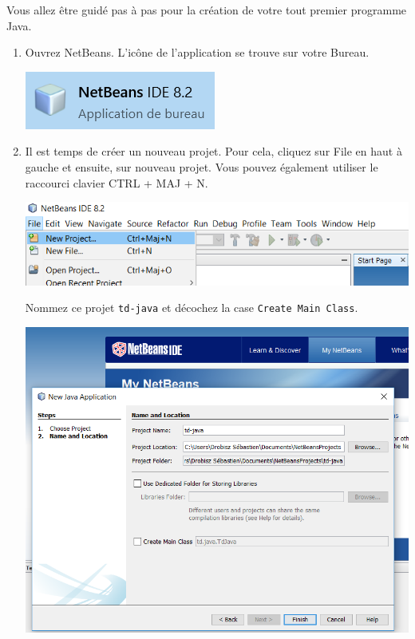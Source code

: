 \documentclass[a4paper,11pt]{article}
\begin{document}
	Vous allez être guidé pas à pas pour la création de votre tout premier programme Java.
	\begin{enumerate}
		\item Ouvrez NetBeans. L'icône de l'application se trouve sur votre Bureau. 
			\begin{center}
				\includegraphics{NetBeans/nb_icone}
			\end{center}


		\item Il est temps de créer un nouveau projet. Pour cela, cliquez sur \og File \fg en haut à gauche et ensuite, sur nouveau projet. Vous pouvez également utiliser le raccourci clavier CTRL + MAJ + N.
			\begin{center}
				\includegraphics[width=\textwidth]{NetBeans/nb_newproject}
			\end{center}
		Nommez ce projet \texttt{td-java} et décochez la case \texttt{Create Main Class}.
			\begin{center}
				\includegraphics[width=\textwidth]{NetBeans/nb_newproject_name}
			\end{center}


\end{enumerate}
\end{document}

